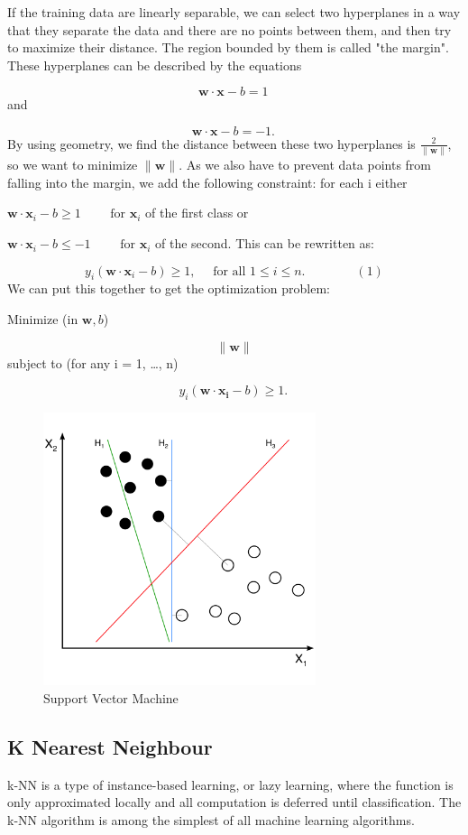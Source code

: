 \documentclass[12pt]{book}
\begin{document}
If the training data are linearly separable, we can select two hyperplanes in a way that they separate the data and there are no points between them, and then try to maximize their distance. 
The region bounded by them is called "the margin". These hyperplanes can be described by the equations

$$\mathbf{w}\cdot\mathbf{x} - b=1\,$$
and

$$\mathbf{w}\cdot\mathbf{x} - b=-1.\,$$
By using geometry, we find the distance between these two hyperplanes is $\tfrac{2}{\|\mathbf{w}\|}$, so we want to minimize $\|\mathbf{w}\|$. As we also have to prevent data points from falling into the margin, we add the following constraint: for each i either

$\mathbf{w}\cdot\mathbf{x}_i - b \ge 1\qquad\text{ for }\mathbf{x}_i $ of the first class
or

$\mathbf{w}\cdot\mathbf{x}_i - b \le -1\qquad\text{ for }\mathbf{x}_i $  of the second.
This can be rewritten as:

$$y_i(\mathbf{w}\cdot\mathbf{x}_i - b) \ge 1, \quad \text{ for all } 1 \le i \le n.\qquad\qquad(1) $$
We can put this together to get the optimization problem:

Minimize (in ${\mathbf{w},b}$)

$$\|\mathbf{w}\|$$
subject to (for any i = 1, \dots, n)

$$y_i(\mathbf{w}\cdot\mathbf{x_i} - b) \ge 1. \, $$

\begin{figure}[H]
\centering
\includegraphics[width=8cm]{Svm2.png}
\caption{Support Vector Machine \cite{wikipedia-svm}}
\label{fig:figure2}
\end{figure}



\subsection{K Nearest Neighbour}
k-NN is a type of instance-based learning, or lazy learning, where the function is only approximated locally and all computation is deferred until classification. The k-NN algorithm is among the simplest of all machine learning algorithms.
\end{document}
